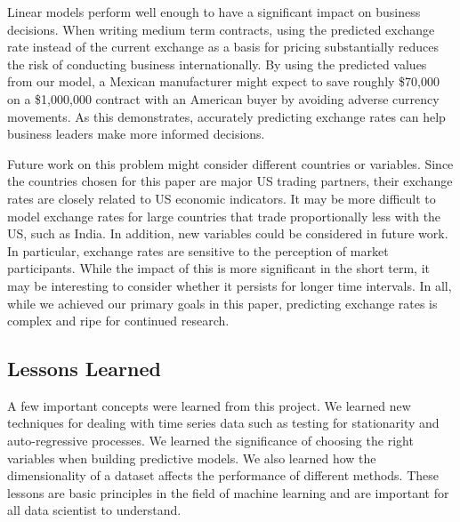 \documentclass{sig-alternate-05-2015}
\begin{document}
Linear models perform well enough to have a significant impact on business decisions. When writing medium term contracts, using the predicted exchange rate instead of the current exchange as a basis for pricing substantially reduces the risk of conducting business internationally. By using the predicted values from our model, a Mexican manufacturer might expect to save roughly \$70,000 on a \$1,000,000 contract with an American buyer by avoiding adverse currency movements. As this demonstrates, accurately predicting exchange rates can help business leaders make more informed decisions.

Future work on this problem might consider different countries or variables. Since the countries chosen for this paper are major US trading partners, their exchange rates are closely related to US economic indicators. It may be more difficult to model exchange rates for large countries that trade proportionally less with the US, such as India. In addition, new variables could be considered in future work. In particular, exchange rates are sensitive to the perception of market participants. While the impact of this is more significant in the short term, it may be interesting to consider whether it persists for longer time intervals. In all, while we achieved our primary goals in this paper, predicting exchange rates is complex and ripe for continued research. 

\subsection{Lessons Learned} 
A few important concepts were learned from this project. We learned new techniques for dealing with time series data such as testing for stationarity and auto-regressive processes. We learned the significance of choosing the right variables when building predictive models. We also learned how the dimensionality of a dataset affects the performance of different methods. These lessons are basic principles in the field of machine learning and are important for all data scientist to understand.

     
\newenvironment{hangref}{\begin{list}{}{\setlength{\itemsep}{0pt}
\setlength{\parsep}{0pt}\setlength{\rightmargin}{0pt}
\setlength{\leftmargin}{+\parindent}
\setlength{\itemindent}{-\parindent}}}{\end{list}}
\end{document}
